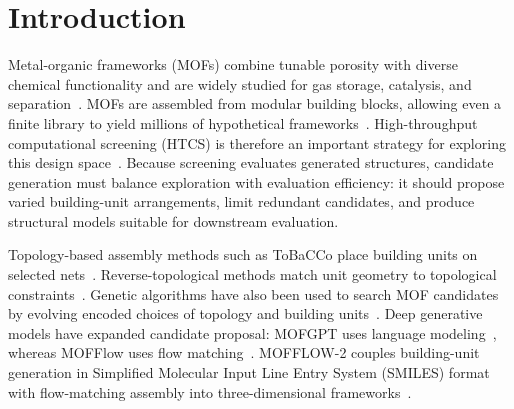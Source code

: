\documentclass[a5paper, 10pt]{article}
\begin{document}
\section{Introduction}
\label{sec:intro}
Metal-organic frameworks (MOFs) combine tunable porosity with diverse chemical functionality and are widely studied for gas storage, catalysis, and separation~\cite{furukawa2013chemistry}.
MOFs are assembled from modular building blocks, allowing even a finite library to yield millions of hypothetical frameworks~\cite{wilmer2012large}. High-throughput computational screening (HTCS) is therefore an important strategy for exploring this design space~\cite{colon2014high}.
Because screening evaluates generated structures, candidate generation must balance exploration with evaluation efficiency: it should propose varied building-unit arrangements, limit redundant candidates, and produce structural models suitable for downstream evaluation.%

Topology-based assembly methods such as ToBaCCo place building units on selected nets~\cite{colon2017topologically}. Reverse-topological methods match unit geometry to topological constraints~\cite{wu2024precisionmof}. Genetic algorithms have also been used to search MOF candidates by evolving encoded choices of topology and building units~\cite{pham2025genetic}. Deep generative models have expanded candidate proposal: MOFGPT uses language modeling~\cite{badrinarayanan2025mofgpt}, whereas MOFFlow uses flow matching~\cite{Kim2024MOFFlowFM}. MOFFLOW-2 couples building-unit generation in Simplified Molecular Input Line Entry System (SMILES) format with flow-matching assembly into three-dimensional frameworks~\cite{kim2025flexiblemof}.%
\end{document}
